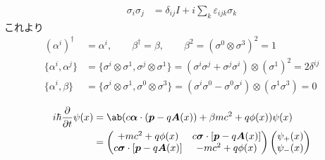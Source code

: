 \documentclass[uplatex,dvipdfmx,a4paper,11pt]{jlreq}
\theoremstyle{definition}
\renewcommand{\AA}{\hat{A}}
\renewcommand{\AA}{\bm{A}}
\newcommand{\pp}{\bm{p}}
\numberwithin{equation}{section}
\begin{document}
\begin{align}
  \sigma_i\sigma_j & = \delta_{ij}I + i\sum_{k}\varepsilon_{ijk}\sigma_k
\end{align}
これより
\begin{align}
  (\alpha^i)^\dagger     & = \alpha^i, \qquad \beta^\dagger = \beta, \qquad \beta^2 = (\sigma^0\otimes\sigma^3)^2 = 1                                       \\
  \{\alpha^i, \alpha^j\} & = \{\sigma^i\otimes\sigma^1, \sigma^j\otimes\sigma^1\} = (\sigma^i\sigma^j + \sigma^j\sigma^i)\otimes(\sigma^1)^2 = 2\delta^{ij} \\
  \{\alpha^i, \beta\}    & = \{\sigma^i\otimes\sigma^1, \sigma^0\otimes\sigma^3\} = (\sigma^i\sigma^0 - \sigma^0\sigma^i)\otimes(\sigma^1\sigma^3) = 0
\end{align}

\begin{align}
  i\hbar\diffp{}{t}\psi(x) & = \ab(c\bm{\alpha}\cdot(\pp - q\AA(x)) + \beta mc^2 + q\phi(x))\psi(x) \\
                           & = \begin{pmatrix}
                                 +mc^2 + q\phi(x)                 & c\bm{\sigma}\cdot[\pp - q\AA(x)] \\
                                 c\bm{\sigma}\cdot[\pp - q\AA(x)] & -mc^2 + q\phi(x)
                               \end{pmatrix}
  \begin{pmatrix}
    \psi_+(x) \\
    \psi_-(x)
  \end{pmatrix}
\end{align}
\end{document}
